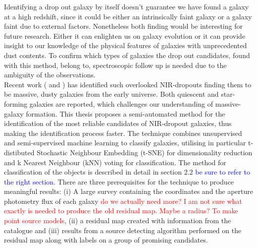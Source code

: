 Identifying a drop out galaxy by itself doesn't guarantee we have found a galaxy at a high redshift, since it could be either an intrinsically faint galaxy or a galaxy faint due to external factors. Nonetheless both finding would be interesting for future research. Either it can enlighten us on galaxy evolution or it can provide insight to our knowledge of the physical features of galaxies with unprecedented dust contents. To confirm which types of galaxies the drop out candidates, found with this method, belong to, spectroscopic follow up is needed due to the ambiguity of the observations. \\

Recent work (\cite{Alcalde_Pampliega_2019} and \cite{Wang_2019}) has identified such overlooked NIR-dropouts finding them to be massive, dusty galaxies from the early universe. Both quiescent and star-forming galaxies are reported, which challenges our understanding of massive-galaxy formation. This thesis proposes a semi-automated method for the identification of the most reliable candidates of NIR-dropout galaxies, thus making the identification process faster. The technique combines unsupervised and semi-supervised machine learning to classify galaxies, utilising in particular t-distibuted Stochastic Neighbour Embedding (t-SNE) for dimensionality reduction and k Nearest Neighbour (kNN) voting for classification. The method for classification of the objects is described in detail in section 2.2 \textcolor{blue}{be sure to refer to the right section}. There are three prerequisites for the technique to produce meaningful results: (i) A large survey containing the coordinates and the aperture photometry flux of each galaxy \textcolor{red}{do we actually need more? I am not sure what exactly is needed to produce the old residual map. Maybe a radius? To make point source models}, (ii) a residual map created with information from the catalogue and (iii) results from a source detecting algorithm performed on the residual map along with labels on a group of promising candidates. \\

